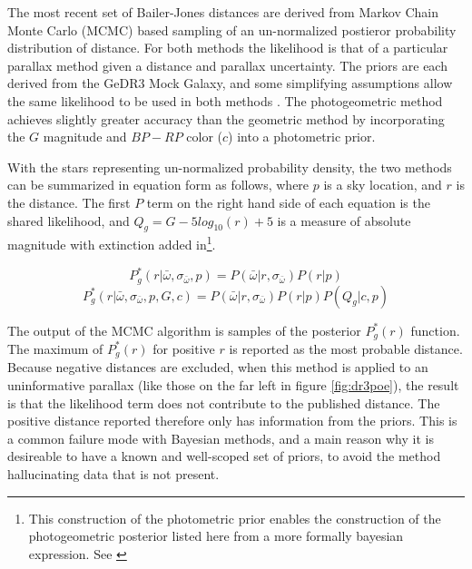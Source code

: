 \documentclass[preprint2]{aastex631}
\begin{document}
The most recent set of Bailer-Jones distances are derived from Markov Chain Monte Carlo (MCMC) based sampling of an un-normalized postieror probability distribution of distance. For both methods the likelihood is that of a particular parallax method given a distance and parallax uncertainty. The priors are each derived from the GeDR3 Mock Galaxy, and some simplifying assumptions allow the same likelihood to be used in both methods \citep{bailer-jonesEstimating2021}. The photogeometric method achieves slightly greater accuracy than the geometric method by incorporating the $G$ magnitude and $BP-RP$ color ($c$) into a photometric prior.

With the stars representing un-normalized probability density, the two methods can be summarized in equation form as follows, where $p$ is a sky location, and $r$ is the distance. The first $P$ term on the right hand side of each equation is the shared likelihood, and $Q_g = G - 5 log_{10}(r) + 5$ is a measure of absolute magnitude with extinction added in\footnote{This construction of the photometric prior enables the construction of the photogeometric posterior listed here from a more formally bayesian expression. See \cite{bailer-jonesEstimating2021} }.

$$ P_g^* (r| \bar{\omega}, \sigma_{\bar{\omega}}, p) = P(\bar{\omega} | r, \sigma_{\bar{\omega}}) P (r | p)$$
$$ P_g^* (r| \bar{\omega}, \sigma_{\bar{\omega}}, p, G, c) = P(\bar{\omega} | r, \sigma_{\bar{\omega}}) P (r | p) P(Q_g| c, p)$$

The output of the MCMC algorithm is samples of the posterior $P_g^*(r)$ function. The maximum of $P_g^*(r)$ for positive $r$ is reported as the most probable distance. Because negative distances are excluded, when this method is applied to an uninformative parallax (like those on the far left in figure \ref{fig:dr3poe}), the result is that the likelihood term does not contribute to the published distance. The positive distance reported therefore only has information from the priors. This is a common failure mode with Bayesian methods, and a main reason why it is desireable to have a known and well-scoped set of priors, to avoid the method hallucinating data that is not present.
\end{document}
